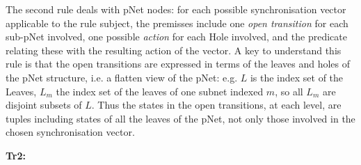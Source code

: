 \documentclass{llncs}
\begin{document}
\begin{definition}
	The second rule deals with pNet nodes: for each possible
	synchronisation vector applicable to the rule subject, the premisses
	include one {\em open transition} for each sub-pNet involved, one possible
	{\em action} for each Hole involved, and the predicate relating these
	with the resulting action of the vector.
	A key to understand this rule is that the open transitions are
	expressed in terms of the leaves and holes of the pNet structure,
	i.e. a flatten view of the pNet: e.g. $L$ is the index set of the
	Leaves, $L_m$ the index set of the leaves of one subnet indexed $m$, so all $L_m$
	are disjoint subsets of $L$. Thus the states in the open transitions,
	at each level, are tuples including states of all the
	leaves of the pNet, not only those involved in the chosen
	synchronisation vector.
	\begin{description}
		\item[{\bf Tr2:}]
	\end{description}
	

\end{definition}
\end{document}
